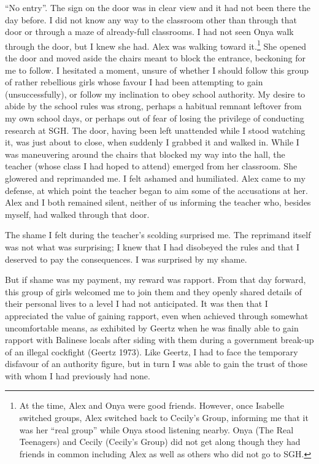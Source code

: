 ``No entry''. The sign on the door was in clear view and it had not been there the day before. I did not know any way to the classroom other than through that door or through a maze of already-full classrooms. I had not seen Onya walk through the door, but I knew she had. Alex was walking toward it.\footnote{At the time, Alex and Onya were good friends. However, once Isabelle switched groups, Alex switched back to Cecily's Group, informing me that it was her ``real group'' while Onya stood listening nearby. Onya (The Real Teenagers) and Cecily (Cecily's Group) did not get along though they had friends in common including Alex as well as others who did not go to SGH.}  She opened the door and moved aside the chairs meant to block the entrance, beckoning for me to follow. I hesitated a moment, unsure of whether I should follow this group of rather rebellious girls whose favour I had been attempting to gain (unsuccessfully), or follow my inclination to obey school authority. My desire to abide by the school rules was strong, perhaps a habitual remnant leftover from my own school days, or perhaps out of fear of losing the privilege of conducting research at SGH. The door, having been left unattended while I stood watching it, was just about to close, when suddenly I grabbed it and walked in. While I was maneuvering around the chairs that blocked my way into the hall, the teacher (whose class I had hoped to attend) emerged from her classroom. She glowered and reprimanded me. I felt ashamed and humiliated. Alex came to my defense, at which point the teacher began to aim some of the accusations at her. Alex and I both remained silent, neither of us informing the teacher who, besides myself, had walked through that door.

The shame I felt during the teacher's scolding surprised me. The reprimand itself was not what was surprising; I knew that I had disobeyed the rules and that I deserved to pay the consequences. I was surprised by my shame. 

But if shame was my payment, my reward was rapport. From that day forward, this group of girls welcomed me to join them and they openly shared details of their personal lives to a level I had not anticipated. It was then that I appreciated the value of gaining rapport, even when achieved through somewhat uncomfortable means, as exhibited by Geertz when he was finally able to gain rapport with Balinese locals after siding with them during a government break-up of an illegal cockfight (Geertz 1973). Like Geertz, I had to face the temporary disfavour of an authority figure, but in turn I was able to gain the trust of those with whom I had previously had none. 

